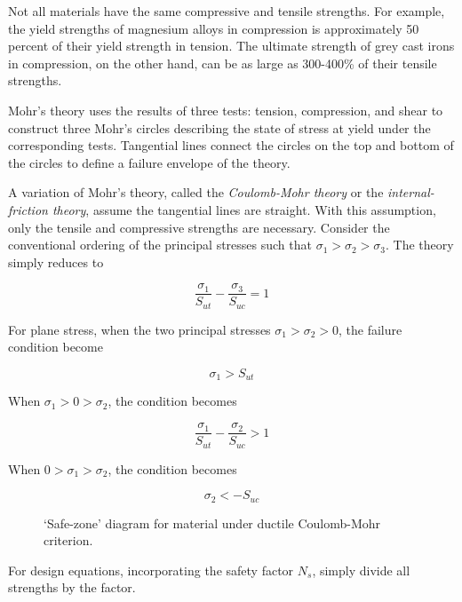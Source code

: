 \documentclass[
10pt,
a4paper,
openany,
svgnames,
]{book}
\begin{document}
Not all materials have the same compressive and tensile strengths. For example, the yield strengths of magnesium alloys in compression is approximately 50 percent of their yield strength in tension. The ultimate strength of grey cast irons in compression, on the other hand, can be as large as 300-400\% of their tensile strengths.

Mohr’s theory uses the results of three tests: tension, compression, and shear to construct three Mohr’s circles describing the state of stress at yield under the corresponding tests. Tangential lines connect the circles on the top and bottom of the circles to define a failure envelope of the theory.

A variation of Mohr’s theory, called the \emph{Coulomb-Mohr theory} or the \emph{internal-friction theory}, assume the tangential lines are straight. With this assumption, only the tensile and compressive strengths are necessary. Consider the conventional ordering of the principal stresses such that $\sigma_1 > \sigma_2 > \sigma_3$. The theory simply reduces to 

\[\frac{\sigma_1}{S_{ut}} - \frac{\sigma_3}{S_{uc}} = 1\]

For plane stress, when the two principal stresses $\sigma_1 > \sigma_2 > 0$, the failure condition become

\[\sigma_1 > S_{ut}\]

When  $\sigma_1 > 0 > \sigma_2$, the condition becomes

\[\frac{\sigma_1}{S_{ut}} - \frac{\sigma_2}{S_{uc}} > 1\]

When  $0 > \sigma_1 > \sigma_2$, the condition becomes

\[\sigma_2 <  - S_{uc}\]

\begin{figure}[h]
  \centering
  \caption{`Safe-zone' diagram for material under ductile Coulomb-Mohr criterion.}
  \label{fig: Coulomb-Mohr ductile safe zone}
\end{figure}

For design equations, incorporating the safety factor $N_s$, simply divide all strengths by the factor.
\end{document}
